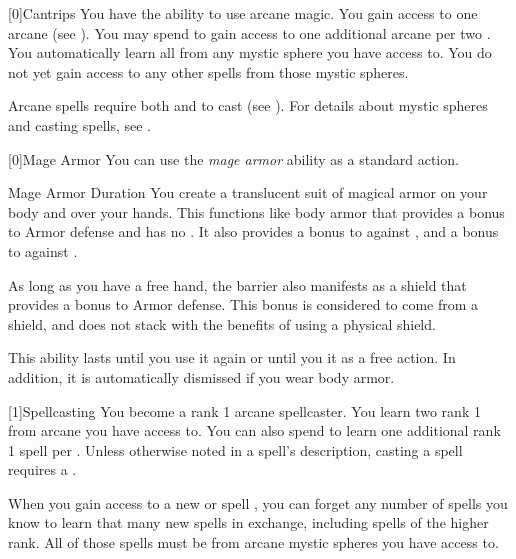         [0]{Cantrips}
        You have the ability to use arcane magic.
        You gain access to one arcane  (see ).
        You may spend  to gain access to one additional arcane  per two .
        You automatically learn all  from any mystic sphere you have access to.
        You do not yet gain access to any other spells from those mystic spheres.

        Arcane spells require both  and  to cast (see ).
        For details about mystic spheres and casting spells, see .

        [0]{Mage Armor} You can use the \textit{mage armor} ability as a standard action.
        \begin{durationability}{Mage Armor}
            Duration
            \rankline
            You create a translucent suit of magical armor on your body and over your hands.
            This functions like body armor that provides a  bonus to Armor defense and has no .
            It also provides a  bonus to  against , and a  bonus to  against .

            As long as you have a free hand, the barrier also manifests as a shield that provides a  bonus to Armor defense.
            This bonus is considered to come from a shield, and does not stack with the benefits of using a physical shield.

            This ability lasts until you use it again or until you  it as a free action.
            In addition, it is automatically dismissed if you wear body armor.
        \end{durationability}

        [1]{Spellcasting}
        You become a rank 1 arcane spellcaster.
        You learn two rank 1  from arcane  you have access to.
        You can also spend  to learn one additional rank 1 spell per .
        Unless otherwise noted in a spell's description, casting a spell requires a .

        When you gain access to a new  or spell ,
            you can forget any number of spells you know to learn that many new spells in exchange,
            including spells of the higher rank.
        All of those spells must be from arcane mystic spheres you have access to.

